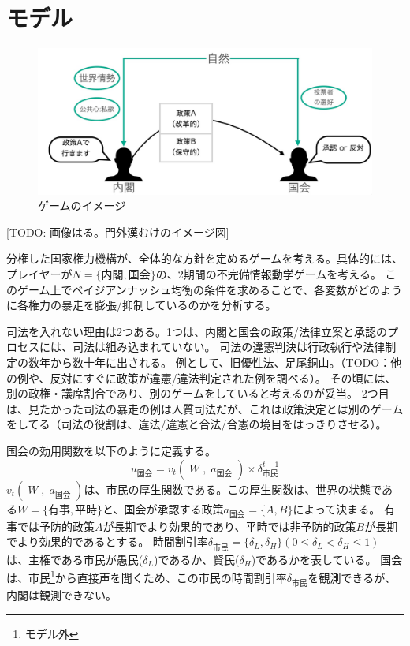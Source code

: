 \documentclass[main.tex]{subfiles}
\begin{document}
\section{モデル}

\begin{figure}[htbp]
  \centering
  \includegraphics[width=1\textwidth]{./image/game_image.jpg}
  \caption{ゲームのイメージ} 
  \label{fig:game_tree}
\end{figure}

[TODO: 画像はる。門外漢むけのイメージ図]

分権した国家権力機構が、全体的な方針を定めるゲームを考える。具体的には、
プレイヤーが$N=\lbrace 内閣, 国会 \rbrace$の、2期間の不完備情報動学ゲームを考える。
このゲーム上でベイジアンナッシュ均衡の条件を求めることで、各変数がどのように各権力の暴走を膨張/抑制しているのかを分析する。



司法を入れない理由は2つある。1つは、内閣と国会の政策/法律立案と承認のプロセスには、司法は組み込まれていない。
司法の違憲判決は行政執行や法律制定の数年から数十年に出される。
例として、旧優性法、足尾銅山。（TODO：他の例や、反対にすぐに政策が違憲/違法判定された例を調べる）。
その頃には、別の政権・議席割合であり、別のゲームをしていると考えるのが妥当。
2つ目は、見たかった司法の暴走の例は人質司法だが、これは政策決定とは別のゲームをしてる（司法の役割は、違法/違憲と合法/合憲の境目をはっきりさせる）。



国会の効用関数を以下のように定義する。
$$u_\text{国会} = v_t(\;W\;,\; a_\text{国会}\;) × \delta^{t-1}_\text{市民}$$
$v_t(\;W\;,\; a_\text{国会}\;)$は、市民の厚生関数である。この厚生関数は、世界の状態である$W=\lbrace 有事, 平時\rbrace$と、国会が承認する政策$a_{国会}=\lbrace A, B\rbrace$によって決まる。
有事では予防的政策$A$が長期でより効果的であり、平時では非予防的政策$B$が長期でより効果的であるとする。
時間割引率$\delta_{市民}=\lbrace \delta_L, \delta_H \rbrace (0\le \delta_L<\delta_H \le 1)$ %
は、主権である市民が愚民($\delta_L$)であるか、賢民($\delta_H$)であるかを表している。
国会は、市民\footnote{モデル外}から直接声を聞くため、この市民の時間割引率$\delta_{市民}$を観測できるが、内閣は観測できない。
\end{document}
